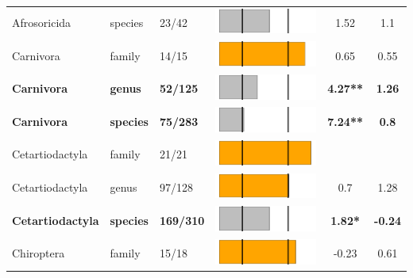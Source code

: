 \begin{longtable}{lL{1.8cm}C{2cm}lcc}
  Afrosoricida & species & 23/42 & \includegraphics[width=0.20\linewidth, height=0.05\linewidth]{Table_figures/bar3.pdf} & 1.52 & 1.1 \\ 
  Carnivora & family & 14/15 & \includegraphics[width=0.20\linewidth, height=0.05\linewidth]{Table_figures/bar4.pdf} & 0.65 & 0.55 \\ 
  \textbf{Carnivora} & \textbf{genus} & \textbf{52/125} & \includegraphics[width=0.20\linewidth, height=0.05\linewidth]{Table_figures/bar5.pdf} & \textbf{4.27**} & \textbf{1.26} \\ 
  \textbf{Carnivora} & \textbf{species} & \textbf{75/283} & \includegraphics[width=0.20\linewidth, height=0.05\linewidth]{Table_figures/bar6.pdf} & \textbf{7.24**} & \textbf{0.8} \\ 
  Cetartiodactyla & family & 21/21 & \includegraphics[width=0.20\linewidth, height=0.05\linewidth]{Table_figures/bar7.pdf} &   &   \\ 
  Cetartiodactyla & genus & 97/128 & \includegraphics[width=0.20\linewidth, height=0.05\linewidth]{Table_figures/bar8.pdf} & 0.7 & 1.28 \\ 
  \textbf{Cetartiodactyla} & \textbf{species} & \textbf{169/310} & \includegraphics[width=0.20\linewidth, height=0.05\linewidth]{Table_figures/bar9.pdf} & \textbf{1.82*} & \textbf{-0.24} \\ 
  Chiroptera & family & 15/18 & \includegraphics[width=0.20\linewidth, height=0.05\linewidth]{Table_figures/bar10.pdf} & -0.23 & 0.61 \\ 

\end{longtable}
